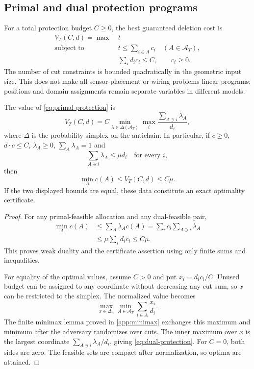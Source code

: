 \subsection{Primal and dual protection programs}
For a total protection budget $C\ge0$, the best guaranteed deletion cost is
\begin{equation}\label{eq:primal-protection}
\begin{aligned}
V_T(C,d)=\max\ &t\\
\text{subject to }&t\le\sum_{i\in A}c_i\quad(A\in\mathcal A_T),\\
&\sum_i d_i c_i\le C,\qquad c_i\ge0.
\end{aligned}
\end{equation}
The number of cut constraints is bounded quadratically in the geometric input size. This does not make all sensor-placement or wiring problems linear programs: positions and domain assignments remain separate variables in different models.

\begin{theorem}\label{thm:protection}
The value of \cref{eq:primal-protection} is
\begin{equation}\label{eq:dual-protection}
V_T(C,d)=C\min_{\lambda\in\Delta(\mathcal A_T)}
\max_i\frac{\sum_{A\ni i}\lambda_A}{d_i},
\end{equation}
where $\Delta$ is the probability simplex on the antichain. In particular, if $c\ge0$, $d\cdot c\le C$, $\lambda_A\ge0$, $\sum_A\lambda_A=1$ and
\begin{equation}\label{eq:dual-feasible}
\sum_{A\ni i}\lambda_A\le\mu d_i\quad\text{for every }i,
\end{equation}
then
\begin{equation}\label{eq:certificate-interval}
\min_A c(A)\le V_T(C,d)\le C\mu.
\end{equation}
If the two displayed bounds are equal, these data constitute an exact optimality certificate.
\end{theorem}
\begin{proof}
For any primal-feasible allocation and any dual-feasible pair,
\[
\begin{aligned}
\min_A c(A)&\le\sum_A\lambda_Ac(A)
=\sum_i c_i\sum_{A\ni i}\lambda_A\\
&\le\mu\sum_i d_i c_i\le C\mu.
\end{aligned}
\]
This proves weak duality and the certificate assertion using only finite sums and inequalities.

For equality of the optimal values, assume $C>0$ and put $x_i=d_i c_i/C$. Unused budget can be assigned to any coordinate without decreasing any cut sum, so $x$ can be restricted to the simplex. The normalized value becomes
\[
\max_{x\in\Delta_n}\min_{A\in\mathcal A_T}
\sum_{i\in A}\frac{x_i}{d_i}.
\]
The finite minimax lemma proved in \cref{app:minimax} exchanges this maximum and minimum after the adversary randomizes over cuts. The inner maximum over $x$ is the largest coordinate $\sum_{A\ni i}\lambda_A/d_i$, giving \cref{eq:dual-protection}. For $C=0$, both sides are zero. The feasible sets are compact after normalization, so optima are attained.
\end{proof}

